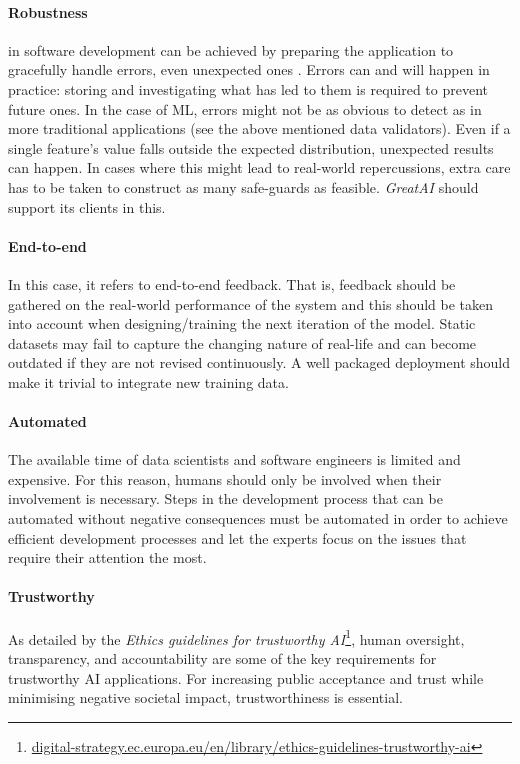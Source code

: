 \paragraph{Robustness} in software development can be achieved by preparing the application to gracefully handle errors, even unexpected ones \cite{bishop1998robust}. Errors can and will happen in practice: storing and investigating what has led to them is required to prevent future ones. In the case of ML, errors might not be as obvious to detect as in more traditional applications (see the above mentioned data validators). Even if a single feature's value falls outside the expected distribution, unexpected results can happen. In cases where this might lead to real-world repercussions, extra care has to be taken to construct as many safe-guards as feasible. \textit{GreatAI} should support its clients in this.

\paragraph{End-to-end} In this case, it refers to end-to-end feedback. That is, feedback should be gathered on the real-world performance of the system and this should be taken into account when designing/training the next iteration of the model. Static datasets may fail to capture the changing nature of real-life and can become outdated if they are not revised continuously. A well packaged deployment should make it trivial to integrate new training data.

\paragraph{Automated} The available time of data scientists and software engineers is limited and expensive. For this reason, humans should only be involved when their involvement is necessary. Steps in the development process that can be automated without negative consequences must be automated in order to achieve efficient development processes and let the experts focus on the issues that require their attention the most.

\paragraph{Trustworthy} As detailed by the \textit{Ethics guidelines for trustworthy AI}\footnote{\href{https://digital-strategy.ec.europa.eu/en/library/ethics-guidelines-trustworthy-ai}{digital-strategy.ec.europa.eu/en/library/ethics-guidelines-trustworthy-ai}}, human oversight, transparency, and accountability are some of the key requirements for trustworthy AI applications. For increasing public acceptance and trust while minimising negative societal impact, trustworthiness is essential.

